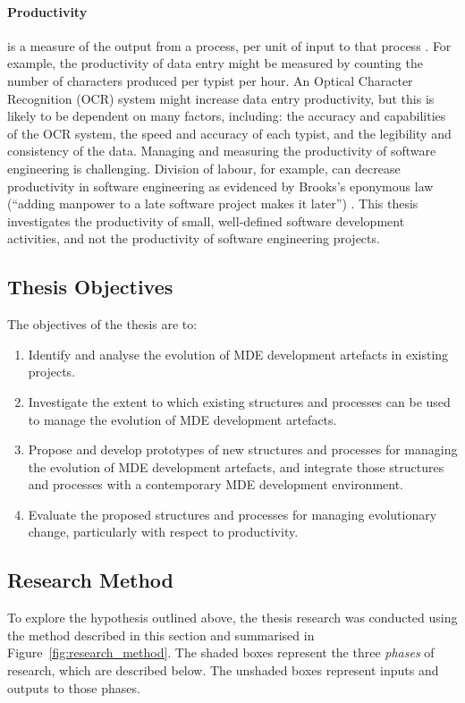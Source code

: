 \paragraph{Productivity} is a measure of the output from a process, per unit of input to that process \cite{beattie07economics}. For example, the productivity of data entry might be measured by counting the number of characters produced per typist per hour. An Optical Character Recognition (OCR) system might increase data entry productivity, but this is likely to be dependent on many factors, including: the accuracy and capabilities of the OCR system, the speed and accuracy of each typist, and the legibility and consistency of the data. Managing and measuring the productivity of software engineering is challenging. Division of labour, for example, can decrease productivity in software engineering as evidenced by Brooks's eponymous law (``adding manpower to a late software project makes it later'') \cite{brooks95mythical}. This thesis investigates the productivity of small, well-defined software development activities, and not the productivity of software engineering projects.

\subsection{Thesis Objectives}
The objectives of the thesis are to:

\begin{enumerate}
	\item Identify and analyse the evolution of MDE development artefacts in existing projects.
	\item Investigate the extent to which existing structures and processes can be used to manage the evolution of MDE development artefacts. 
	\item Propose and develop prototypes of new structures and processes for managing the evolution of MDE development artefacts, and integrate those structures and processes with a contemporary MDE development environment.
	\item Evaluate the proposed structures and processes for managing evolutionary change, particularly with respect to productivity.
\end{enumerate}

\subsection{Research Method}
\label{sec:research_method}
To explore the hypothesis outlined above, the thesis research was conducted using the method described in this section and summarised in Figure~\ref{fig:research_method}. The shaded boxes represent the three \emph{phases} of research, which are described below. The unshaded boxes represent inputs and outputs to those phases.

